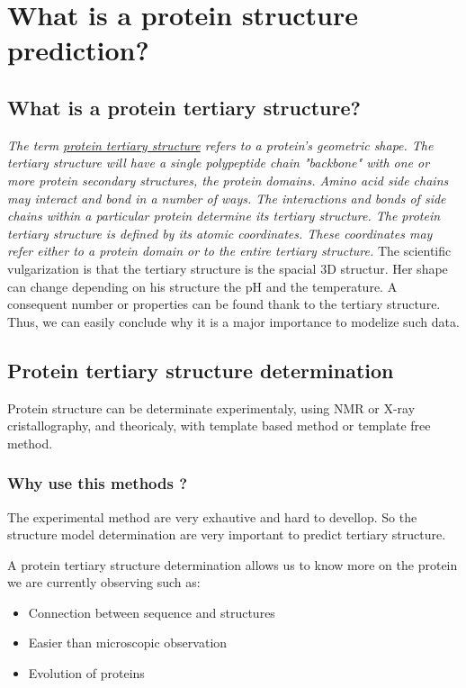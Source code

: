 \section{What is a protein structure prediction? }
\subsection{What is a protein tertiary structure? } 
\emph{The term \underline{protein tertiary structure} refers to a protein's geometric shape. The tertiary structure will have a single polypeptide chain "backbone" with one or more protein secondary structures, the protein domains. Amino acid side chains may interact and bond in a number of ways. The interactions and bonds of side chains within a particular protein determine its tertiary structure. The protein tertiary structure is defined by its atomic coordinates. These coordinates may refer either to a protein domain or to the entire tertiary structure.}
\newline \newline
The scientific vulgarization is that the tertiary structure is the spacial 3D structur. Her shape can change depending on his structure the pH and the temperature. A consequent number or properties can be found thank to the tertiary structure.
\newline
Thus, we can easily conclude why it is a major importance to modelize such data.

\subsection{Protein tertiary structure determination}
   
   Protein structure can be determinate experimentaly, using NMR or X-ray cristallography, and theoricaly, with template based method or template free method.\\

   \subsubsection{Why use this methods ?}

   The experimental method are very exhautive and hard to devellop. So the structure model determination are very important to predict tertiary structure.

   A protein tertiary structure determination allows us to know more on the protein we are currently observing such as:
      \begin{itemize}
	 \item Connection between sequence and structures
	 \item  Easier than microscopic observation
	 \item Evolution of proteins
      \end{itemize}
     
